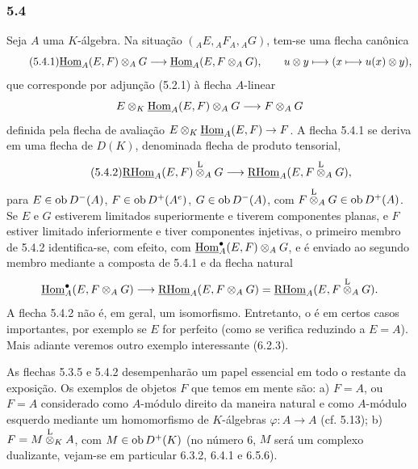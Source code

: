 \subsubsection*{5.4}

Seja $A$ uma $K$-álgebra. Na situação $({}_AE,{}_AF_A,{}_AG)$, tem-se uma flecha canônica
\begin{equation}\tag{5.4.1}
\underline{\operatorname{Hom}}_A(E,F)\otimes_AG\longrightarrow\underline{\operatorname{Hom}}_A(E,F\otimes_AG),
\qquad u\otimes y\longmapsto(x\longmapsto u(x)\otimes y),
\end{equation}
que corresponde por adjunção (5.2.1) à flecha $A$-linear
\[
E\otimes_K\underline{\operatorname{Hom}}_A(E,F)\otimes_AG\longrightarrow F\otimes_AG
\]
definida pela flecha de avaliação $E\otimes_K\underline{\operatorname{Hom}}_A(E,F)\to F$. A flecha 5.4.1 se deriva em uma flecha de $D(K)$, denominada flecha de produto tensorial,
\begin{equation}\tag{5.4.2}
\underline{\mathrm{RHom}}_A(E,F)\overset{\mathrm L}{\otimes}_AG\longrightarrow\underline{\mathrm{RHom}}_A(E,F\overset{\mathrm L}{\otimes}_AG),
\end{equation}
para $E\in\operatorname{ob} D^-(A)$, $F\in\operatorname{ob} D^+(A^e)$, $G\in\operatorname{ob} D^-(A)$, com $F\overset{\mathrm L}{\otimes}_AG\in\operatorname{ob} D^+(A)$. Se $E$ e $G$ estiverem limitados superiormente e tiverem componentes planas, e $F$ estiver limitado inferiormente e tiver componentes injetivas, o primeiro membro de 5.4.2 identifica-se, com efeito, com $\underline{\operatorname{Hom}}_A^\bullet(E,F)\otimes_AG$, e é enviado ao segundo membro mediante a composta de 5.4.1 e da flecha natural
\[
\underline{\operatorname{Hom}}_A^\bullet(E,F\otimes_AG)\longrightarrow \underline{\mathrm{RHom}}_A(E,F\otimes_AG)=\underline{\mathrm{RHom}}_A(E,F\overset{\mathrm L}{\otimes}_AG).
\]
A flecha 5.4.2 não é, em geral, um isomorfismo. Entretanto, o é em certos casos importantes, por exemplo se $E$ for perfeito (como se verifica reduzindo a $E=A$). Mais adiante veremos outro exemplo interessante (6.2.3).

As flechas 5.3.5 e 5.4.2 desempenharão um papel essencial em todo o restante da exposição. Os exemplos de objetos $F$ que temos em mente são: a) $F=A$, ou $F=A$ considerado como $A$-módulo direito da maneira natural e como $A$-módulo esquerdo mediante um homomorfismo de $K$-álgebras $\varphi:A\to A$ (cf. 5.13); b) $F=M\overset{\mathrm L}{\otimes}_KA$, com $M\in\operatorname{ob} D^+(K)$ (no número 6, $M$ será um complexo dualizante, vejam-se em particular 6.3.2, 6.4.1 e 6.5.6).

